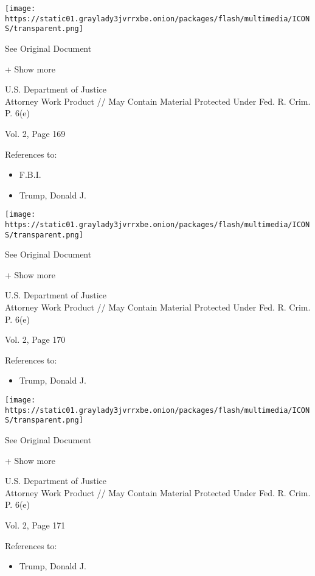 \protect\hyperlink{}{}

\texttt{[image: https://static01.graylady3jvrrxbe.onion/packages/flash/multimedia/ICONS/transparent.png]}

See Original Document

+ Show more

U.S. Department of Justice\\
Attorney Work Product // May Contain Material Protected Under Fed. R.
Crim. P. 6(e)

Vol. 2, Page 169

References to:

\begin{itemize}
\tightlist
\item
  F.B.I.
\item
  Trump, Donald J.
\end{itemize}

\protect\hyperlink{}{}

\texttt{[image: https://static01.graylady3jvrrxbe.onion/packages/flash/multimedia/ICONS/transparent.png]}

See Original Document

+ Show more

U.S. Department of Justice\\
Attorney Work Product // May Contain Material Protected Under Fed. R.
Crim. P. 6(e)

Vol. 2, Page 170

References to:

\begin{itemize}
\tightlist
\item
  Trump, Donald J.
\end{itemize}

\protect\hyperlink{}{}

\texttt{[image: https://static01.graylady3jvrrxbe.onion/packages/flash/multimedia/ICONS/transparent.png]}

See Original Document

+ Show more

U.S. Department of Justice\\
Attorney Work Product // May Contain Material Protected Under Fed. R.
Crim. P. 6(e)

Vol. 2, Page 171

References to:

\begin{itemize}
\tightlist
\item
  Trump, Donald J.
\end{itemize}

